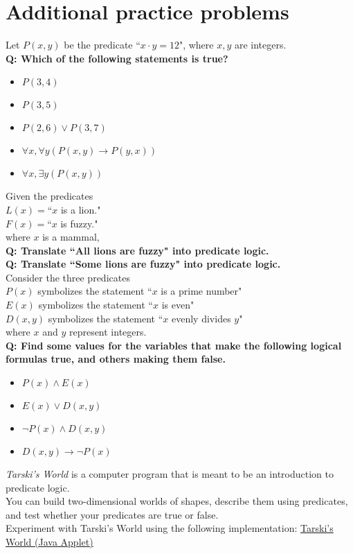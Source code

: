 \documentclass{article}
\begin{document}
\section{\sc Additional practice problems}
Let $P(x,y)$ be the predicate ``$x\cdot y=12$", where $x,y$ are integers.\\
{\bf Q: Which of the following statements is true?}
\begin{itemize}
\item $P(3,4)$
\item $P(3,5)$
\item $P(2,6)\vee P(3,7)$
\item $\forall x,\forall y(P(x,y)\to P(y,x))$
\item $\forall x,\exists y(P(x,y))$
\end{itemize}
\vspace{1ex}Given the predicates\\
$L(x)=$``$x$ is a lion."\\
$F(x)=$``$x$ is fuzzy."\\
where $x$ is a mammal,\\
{\bf Q: Translate ``All lions are fuzzy" into predicate logic.}\\[1ex]
{\bf Q: Translate ``Some lions are fuzzy" into predicate logic.}\\[1em]
Consider the three predicates\\
$P(x)$ symbolizes the statement ``$x$ is a prime number"\\
$E(x)$ symbolizes the statement ``$x$ is even"\\
$D(x, y)$ symbolizes the statement ``$x$ evenly divides $y$"\\
where $x$ and $y$ represent integers.\\
{\bf Q: Find some values for the variables that make the following logical formulas true, and others making them false.}
\begin{itemize}
\item $P(x) \wedge E(x)$
\item $E(x) \vee D(x, y)$
\item $\neg P(x) \wedge D(x, y)$
\item $D(x, y) \to\neg P(x)$
\end{itemize}
\vspace{1ex}\textit{Tarski's World} is a computer program that is meant to be an introduction to predicate logic.\\
You can build two-dimensional worlds of shapes, describe them using predicates, and test whether your predicates are true or false.\\
Experiment with Tarski's World using the following implementation: \href{http://courses.cs.washington.edu/courses/cse590d/03sp/tarski/tarski.html}{Tarski's World (Java Applet)}
\end{document}
